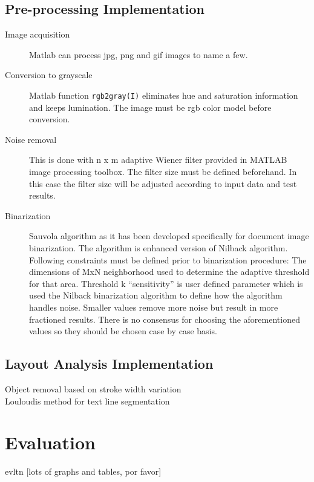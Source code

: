 \documentclass{article}
\def\code#1{\texttt{#1}}
\begin{document}
    \subsection{Pre-processing Implementation}
      \begin{description}
        \item [Image acquisition] Matlab can process jpg, png and gif images to name a few.
        \item [Conversion to grayscale] Matlab function \code{rgb2gray(I)} eliminates hue and saturation information and keeps lumination. The image must be rgb color model before conversion.
        \item [Noise removal] This is done with n x m adaptive Wiener filter provided in MATLAB image processing toolbox. The filter size must be defined beforehand. In this case the filter size will be adjusted according to input data and test results.
        \item [Binarization] Sauvola algorithm as it has been developed specifically for document image binarization. The algorithm is enhanced version of Nilback algorithm. \cite{Sauvola2000}
        Following  constraints must be defined prior to binarization procedure: The dimensions of MxN neighborhood used to determine the adaptive threshold for that area. Threshold k ``sensitivity'' is user defined parameter which is used the Nilback binarization algorithm to define how the algorithm handles noise. Smaller values remove more noise but result in more fractioned results. There is no consensus for choosing the aforementioned values so they should be chosen case by case basis.
      \end{description}

      \subsection{Layout Analysis Implementation}
        \begin{description}
          \item [Object removal based on stroke width variation]
          \item [Louloudis method for text line segmentation]
        \end{description}
  \newpage
  \section{Evaluation}
  evltn [lots of graphs and tables, por favor]

  \newpage
  
  
\end{document}
